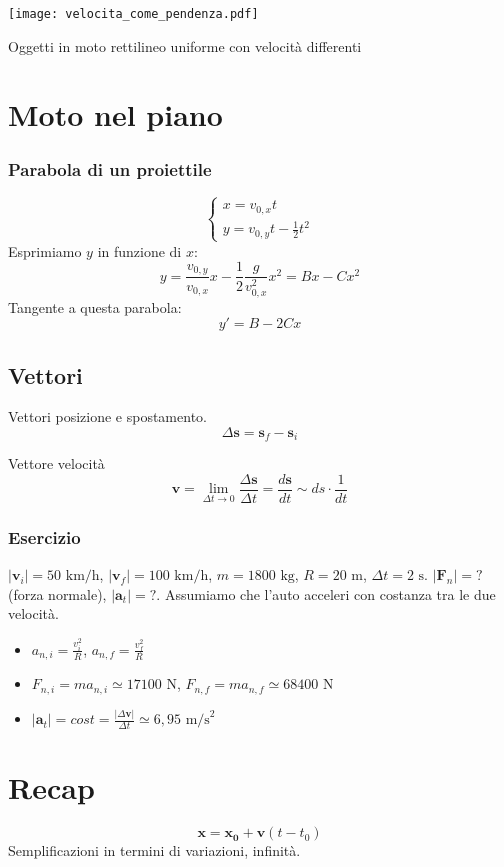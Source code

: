 \begin{marginfigure}
    \centering
    \texttt{[image: velocita\_come\_pendenza.pdf]}
    \caption{Oggetti in moto rettilineo uniforme con velocità differenti}
\end{marginfigure}


\section*{Moto nel piano}

\subsubsection*{Parabola di un proiettile}
\[
    \begin{cases}
        x = v_{0,x}t\\
        y = v_{0,y}t - \frac{1}{2}t^2
    \end{cases}
\]
Esprimiamo $y$ in funzione di $x$:
\[
    y = \frac{v_{0,y}}{v_{0,x}}x - \frac{1}{2}\frac{g}{v_{0,x}^2}x^2 = Bx - Cx^2
\]
Tangente a questa parabola:
\[
    y' = B - 2Cx
\]

\subsection*{Vettori}
Vettori posizione e spostamento.
\[ \Delta\mathbf{s} = \mathbf{s}_f - \mathbf{s}_i \]

Vettore velocità
\[ \mathbf{v} = \lim_{\Delta t \to 0}\frac{\Delta\mathbf{s}}{\Delta t} = \frac{d\mathbf{s}}{dt} \sim ds\cdot\frac{1}{dt} \]


\subsubsection*{Esercizio}
$|\mathbf{v}_i| = 50\text{ km/h}$, $|\mathbf{v}_f| = 100\text{ km/h}$,
$m = 1800\text{ kg}$, $R = 20\text{ m}$, $\Delta t = 2\text{ s}$. $|\mathbf{F}_n| = ?$ (forza normale),
$|\mathbf{a}_t| = ?$. Assumiamo che l'auto acceleri con costanza tra le
due velocità.

\begin{itemize}
    \item $a_{n,i} = \frac{v_i^2}{R}$, $a_{n,f} = \frac{v_f^2}{R}$
    \item $F_{n,i} = ma_{n,i} \simeq 17100 \text{ N}$, $F_{n,f} = ma_{n,f} \simeq 68400\text{ N}$
    \item $|\mathbf{a}_t| = \textit{cost} = \frac{|\Delta\mathbf{v}|}{\Delta t} \simeq 6,95\text{ m/s}^2$
\end{itemize}

\section*{Recap}
\[ \mathbf{x} = \mathbf{x_0} + \mathbf{v}(t - t_0) \]
Semplificazioni in termini di variazioni, infinità.